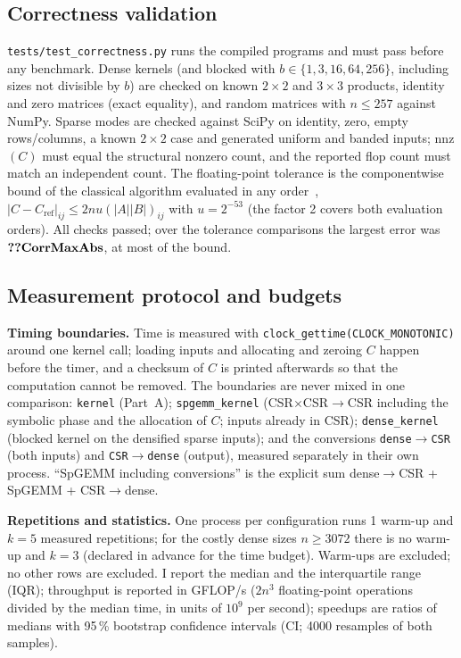 \documentclass[conference,a4paper]{IEEEtran}
\begin{document}
\subsection{Correctness validation}
\texttt{tests/test\_correctness.py} runs the compiled programs and must pass before any benchmark. Dense
kernels (and blocked with $b\in\{1,3,16,64,256\}$, including sizes not divisible by $b$) are checked on known
$2\times2$ and $3\times3$ products, identity and zero matrices (exact equality), and random matrices with
$n\le 257$ against NumPy. Sparse modes are checked against SciPy on identity, zero, empty rows/columns, a
known $2\times2$ case and generated uniform and banded inputs; nnz$(C)$ must equal the structural nonzero
count, and the reported flop count must match an independent count. The floating-point tolerance is the
componentwise bound of the classical algorithm evaluated in any order~\cite{higham2002},
$|C-C_{\mathrm{ref}}|_{ij}\le 2nu(|A||B|)_{ij}$ with $u=2^{-53}$ (the factor 2 covers both evaluation
orders). All checks passed; over the  tolerance comparisons the largest error was
$\val{CorrMaxAbs}$, at most  of the bound.

\subsection{Measurement protocol and budgets}
\label{sec:protocol}
\textbf{Timing boundaries.} Time is measured with \texttt{clock\_gettime(CLOCK\_MONOTONIC)} around one kernel
call; loading inputs and allocating and zeroing $C$ happen before the timer, and a checksum of $C$ is printed
afterwards so that the computation cannot be removed. The boundaries are never mixed in one comparison:
\texttt{kernel} (Part~A); \texttt{spgemm\_kernel} (CSR$\times$CSR$\to$CSR including the symbolic phase and the
allocation of $C$; inputs already in CSR); \texttt{dense\_kernel} (blocked kernel on the densified sparse
inputs); and the conversions \texttt{dense$\to$CSR} (both inputs) and \texttt{CSR$\to$dense} (output), measured
separately in their own process. ``SpGEMM including conversions'' is the explicit sum
dense$\to$CSR + SpGEMM + CSR$\to$dense.

\textbf{Repetitions and statistics.} One process per configuration runs 1 warm-up and $k=5$ measured
repetitions; for the costly dense sizes $n\ge 3072$ there is no warm-up and $k=3$ (declared in advance for the
time budget). Warm-ups are excluded; no other rows are excluded. I report the median and the interquartile
range (IQR); throughput is reported in GFLOP/s ($2n^3$ floating-point operations divided by
the median time, in units of $10^9$ per second); speedups are ratios of medians with 95\,\% bootstrap confidence intervals (CI; 4000 resamples
of both samples).
\end{document}
